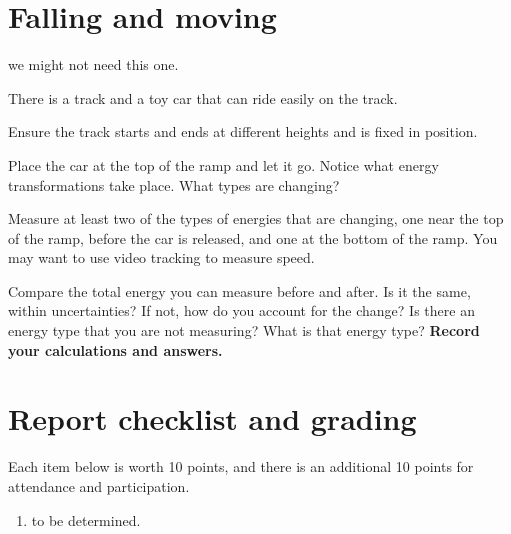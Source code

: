 \section{Falling and moving}

we might not need this one.

There is a track and a toy car that can ride easily on the track.

\begin{steps}
	\item Ensure the track starts and ends at different heights and is fixed in position.
	
	\item Place the car at the top of the ramp and let it go. Notice what energy transformations take place. What types are changing?
	
	\item Measure at least two of the types of energies that are changing, one near the top of the ramp, before the car is released, and one at the bottom of the ramp. You may want to use video tracking to measure speed.
	
	\item Compare the total energy you can measure before and after. Is it the same, within uncertainties? If not, how do you account for the change? Is there an energy type that you are not measuring? What is that energy type? \textbf{Record your calculations and answers.}
\end{steps}

\section{Report checklist and grading}

Each item below is worth 10 points, and there is an additional 10 points for attendance and participation.

\begin{enumerate}
	\item to be determined.
\end{enumerate}